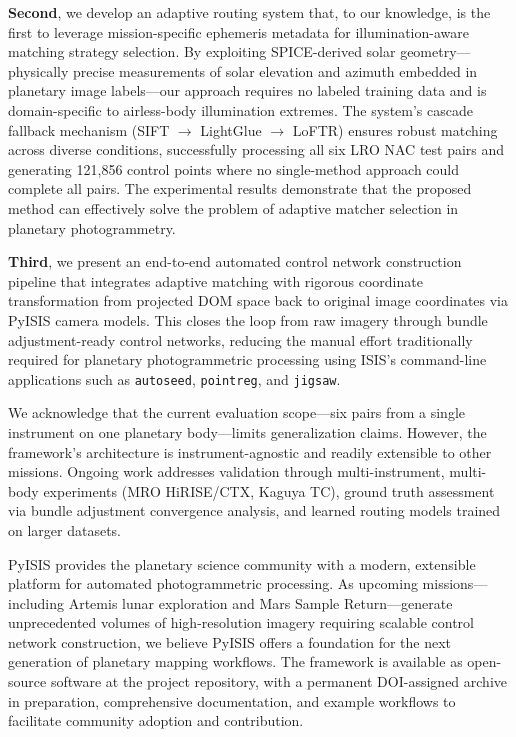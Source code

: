 \documentclass[lettersize,journal]{IEEEtran}
\newcommand{\pyisis}{PyISIS}
\begin{document}
\textbf{Second}, we develop an adaptive routing system that, to our knowledge, is the first to leverage mission-specific ephemeris metadata for illumination-aware matching strategy selection. By exploiting SPICE-derived solar geometry—physically precise measurements of solar elevation and azimuth embedded in planetary image labels—our approach requires no labeled training data and is domain-specific to airless-body illumination extremes. The system's cascade fallback mechanism (SIFT $\rightarrow$ LightGlue $\rightarrow$ LoFTR) ensures robust matching across diverse conditions, successfully processing all six LRO NAC test pairs and generating 121,856 control points where no single-method approach could complete all pairs. The experimental results demonstrate that the proposed method can effectively solve the problem of adaptive matcher selection in planetary photogrammetry.

\textbf{Third}, we present an end-to-end automated control network construction pipeline that integrates adaptive matching with rigorous coordinate transformation from projected DOM space back to original image coordinates via \pyisis{} camera models. This closes the loop from raw imagery through bundle adjustment-ready control networks, reducing the manual effort traditionally required for planetary photogrammetric processing using ISIS's command-line applications such as \texttt{autoseed}, \texttt{pointreg}, and \texttt{jigsaw}.

We acknowledge that the current evaluation scope—six pairs from a single instrument on one planetary body—limits generalization claims. However, the framework's architecture is instrument-agnostic and readily extensible to other missions. Ongoing work addresses validation through multi-instrument, multi-body experiments (MRO HiRISE/CTX, Kaguya TC), ground truth assessment via bundle adjustment convergence analysis, and learned routing models trained on larger datasets.

\pyisis{} provides the planetary science community with a modern, extensible platform for automated photogrammetric processing. As upcoming missions—including Artemis lunar exploration and Mars Sample Return—generate unprecedented volumes of high-resolution imagery requiring scalable control network construction, we believe \pyisis{} offers a foundation for the next generation of planetary mapping workflows. The framework is available as open-source software at the project repository, with a permanent DOI-assigned archive in preparation, comprehensive documentation, and example workflows to facilitate community adoption and contribution.
\end{document}
